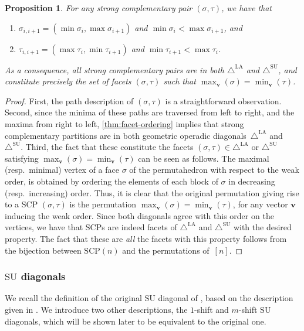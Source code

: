 \documentclass{amsart}
\newtheorem{proposition}[theorem]{Proposition}
\theoremstyle{definition}
\renewcommand{\b}[1]{{\boldsymbol{#1}}} %
\newcommand{\resp}{resp.~} %
\renewcommand{\b}[1]{\boldsymbol{#1}} %
\newcommand{\SU}{\mathrm{SU}}
\newcommand{\SUD}{\triangle^{\mathrm{SU}}}
\newcommand{\LAD}{\triangle^{\mathrm{LA}}}
\newcommand{\SCP}{\mathrm{SCP}}
\begin{document}
\begin{proposition} 
\label{lem:SCP-path-desc}
For any strong complementary pair $(\sigma,\tau)$, we have that
\begin{enumerate}
	\item $ \sigma_{i,i+1} = ( \min \sigma_i, \max \sigma_{i+1} )$ and $\min \sigma_i< \max \sigma_{i+1}$, and
	\item $  \tau_{i,i+1} =  ( \max \tau_i, \min \tau_{i+1} )$ and $\min \tau_{i+1}< \max \tau_{i}$.
\end{enumerate}
As a consequence, all strong complementary pairs are in both $\LAD$ and $\SUD$, and constitute precisely the set of facets $(\sigma,\tau)$ such that $\max_{\b{v}}(\sigma) = \min_{\b{v}}(\tau)$.
\end{proposition}
\begin{proof}
First, the path description of $(\sigma,\tau)$ is a straightforward observation. 
Second, since the minima of these paths are traversed from left to right, and the maxima from right to left, \cref{thm:facet-ordering} implies that strong complementary partitions are in both geometric operadic diagonals~$\LAD$ and~$\SUD$.
Third, the fact that these constitute the facets $(\sigma,\tau) \in \LAD$ or $\SUD$ satisfying $\max_{\b{v}}(\sigma) = \min_{\b{v}}(\tau)$ can be seen as follows.
The maximal (\resp minimal) vertex of a face $\sigma$ of the permutahedron with respect to the weak order, is obtained by ordering the elements of each block of $\sigma$ in decreasing (\resp increasing) order. 
Thus, it is clear that the original permutation giving rise to a $\SCP$ $(\sigma,\tau)$ is the permutation $\max_{\b{v}}(\sigma)=\min_{\b{v}}(\tau)$, for any vector $\b{v}$ inducing the weak order.
Since both diagonals agree with this order on the vertices, we have that $\SCP$s are indeed facets of $\LAD$ and $\SUD$ with the desired property. 
The fact that these are \emph{all} the facets with this property follows from the bijection between $\SCP(n)$ and the permutations of~$[n]$.
\end{proof}



\subsubsection{$\SU$ diagonals}

We recall the definition of the original $\SU$ diagonal of \cite{SaneblidzeUmble}, based on the description given in \cite{SaneblidzeUmble-comparingDiagonals}.
We introduce two other descriptions, the $1$-shift and $m$-shift $\SU$ diagonals, which will be shown later to be equivalent to the original one.
\end{document}
